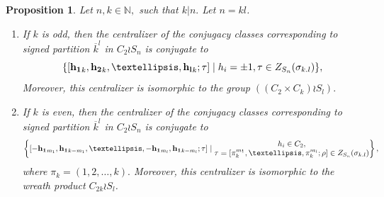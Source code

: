 \documentclass[12pt,twoside,reqno]{amsart}
\newtheorem{proposition}[theorem]{Proposition}
\theoremstyle{definition}
\numberwithin{equation}{section}
\begin{document}
\begin{proposition}\label{Prop_overline_kl}
Let $n,k \in \mathbb N,$ such that $k|n.$  Let $n = kl$. 
\begin{enumerate}
    \item If $k$ is odd, then the centralizer of the conjugacy classes corresponding to signed partition $\overline{k}^l$ in $C_2 \wr S_n$ is conjugate to 
$$ \{[{\bf h_1}_k,{\bf h_2}_k,\ldots, {\bf h_l}_k;\tau]\mid h_i = \pm1, \tau\in Z_{S_n}({\bf \sigma}_{k.l}) \},$$ 
Moreover, this centralizer is isomorphic to the group $((C_2\times C_k)\wr S_l).$
  \item If $k$ is even, then the centralizer of the conjugacy classes corresponding to signed partition $\overline{k}^l$ in $C_2 \wr S_n$ is conjugate to 
  $$\left\{ [-{\bf h_1}_{m_1}, {\bf h_1}_{k-m_1},\ldots,-{\bf h_1}_{m_l}, {\bf h_1}_{k-m_l}; \tau]\mid\begin{matrix}  h_i \in C_2, \\ \tau =[\pi_k^{m_1},\ldots,\pi_k^{m_l};\rho] \in Z_{S_n}({\bf \sigma}_{k.l})\end{matrix}
\right\},$$ where $\pi_k=(1,2,\dots,k).$
Moreover, this centralizer is isomorphic to the wreath product $C_{2k}\wr S_l$.
\end{enumerate}

\end{proposition}
\end{document}
